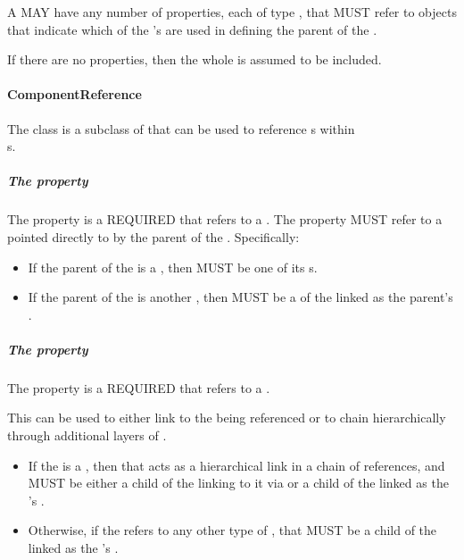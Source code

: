 A  MAY have any number of  properties, each of type , that MUST refer to   objects that indicate which  of the  's  are used in defining the parent of the .

If there are no  properties, then the whole  is assumed to be included. 


\paragraph{ComponentReference}
\label{sec:ComponentReference}

The  class is a subclass of  that can be used to reference s within\\ s. 

\subparagraph{The  property}\label{sec:inChildOf}

The  property is a REQUIRED  that refers to a . 
The  property MUST refer to a  pointed directly to by the parent of the .
Specifically:
\begin{itemize}
\item If the parent of the  is a , then  MUST be one of its s.
\item If the parent of the  is another , then  MUST be a  of the  linked as  the parent's  .
\end{itemize}

\subparagraph{The  property}\label{sec:hasFeature:CR}

The  property is a REQUIRED  that refers to a .

This can be used to either link to the  being referenced or to chain hierarchically through additional layers of .
\begin{itemize}
\item If the  is a , then that  acts as a hierarchical link in a chain of references, and MUST be either a child of the  linking to it via  or a child of the  linked as  the 's  .
\item Otherwise, if the  refers to any other type of , that  MUST be a child of the  linked as  the 's  .
\end{itemize}

